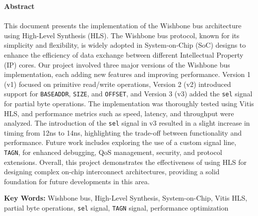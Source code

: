 \documentclass[12pt]{report}
\begin{document}
\newpage
\noindent
{\Large{\textbf{Abstract}}}
\\ \hspace*{\fill} \\
This document presents the implementation of the Wishbone bus architecture using High-Level Synthesis (HLS). The Wishbone bus protocol, known for its simplicity and flexibility, is widely adopted in System-on-Chip (SoC) designs to enhance the efficiency of data exchange between different Intellectual Property (IP) cores. Our project involved three major versions of the Wishbone bus implementation, each adding new features and improving performance. Version 1 (v1) focused on primitive read/write operations, Version 2 (v2) introduced support for \texttt{BASEADDR}, \texttt{SIZE}, and \texttt{OFFSET}, and Version 3 (v3) added the \texttt{sel} signal for partial byte operations. The implementation was thoroughly tested using Vitis HLS, and performance metrics such as speed, latency, and throughput were analyzed. The introduction of the \texttt{sel} signal in v3 resulted in a slight increase in timing from 12ns to 14ns, highlighting the trade-off between functionality and performance. Future work includes exploring the use of a custom signal line, \texttt{TAGN}, for enhanced debugging, QoS management, security, and protocol extensions. Overall, this project demonstrates the effectiveness of using HLS for designing complex on-chip interconnect architectures, providing a solid foundation for future developments in this area.

\noindent
\textbf{Key Words:} Wishbone bus, High-Level Synthesis, System-on-Chip, Vitis HLS, partial byte operations, \texttt{sel} signal, \texttt{TAGN} signal, performance optimization



\newpage

\doublespacing
\tableofcontents	%
\thispagestyle{empty}
\clearpage


    
\setlength{\parskip}{2mm}
\end{document}
